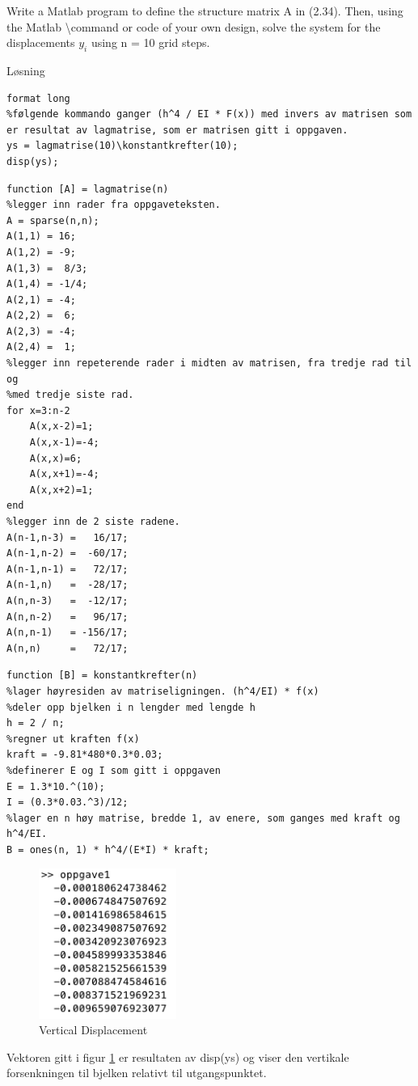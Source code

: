 % 

Write a Matlab program to define the structure matrix A in (2.34). Then, using the Matlab \textbackslash command or code of your own design, solve the system for the displacements $y_i$ using n = 10 grid steps.

\vspace{5mm}
Løsning

\begin{lstlisting}[caption={oppgave1.m}]
format long
%følgende kommando ganger (h^4 / EI * F(x)) med invers av matrisen som er resultat av lagmatrise, som er matrisen gitt i oppgaven.
ys = lagmatrise(10)\konstantkrefter(10);
disp(ys); 
\end{lstlisting}

\begin{lstlisting}[caption={lagmatrise.m}]
function [A] = lagmatrise(n)
%legger inn rader fra oppgaveteksten. 
A = sparse(n,n);
A(1,1) = 16;
A(1,2) = -9;
A(1,3) =  8/3;
A(1,4) = -1/4;
A(2,1) = -4;
A(2,2) =  6;
A(2,3) = -4;
A(2,4) =  1;
%legger inn repeterende rader i midten av matrisen, fra tredje rad til og
%med tredje siste rad. 
for x=3:n-2
    A(x,x-2)=1;
    A(x,x-1)=-4;
    A(x,x)=6;
    A(x,x+1)=-4;
    A(x,x+2)=1;
end
%legger inn de 2 siste radene. 
A(n-1,n-3) =   16/17;
A(n-1,n-2) =  -60/17;
A(n-1,n-1) =   72/17;
A(n-1,n)   =  -28/17;
A(n,n-3)   =  -12/17;
A(n,n-2)   =   96/17;
A(n,n-1)   = -156/17;
A(n,n)     =   72/17;
\end{lstlisting}

\begin{lstlisting}[caption={konstantkrefter.m}]
function [B] = konstantkrefter(n)
%lager høyresiden av matriseligningen. (h^4/EI) * f(x) 
%deler opp bjelken i n lengder med lengde h 
h = 2 / n;        
%regner ut kraften f(x) 
kraft = -9.81*480*0.3*0.03; 
%definerer E og I som gitt i oppgaven
E = 1.3*10.^(10); 
I = (0.3*0.03.^3)/12; 
%lager en n høy matrise, bredde 1, av enere, som ganges med kraft og h^4/EI.
B = ones(n, 1) * h^4/(E*I) * kraft;
\end{lstlisting}

\vspace{3mm}


\begin{figure}[h]
    \centering
    \includegraphics[width=0.4\textwidth]{oppgave1disp}
    \caption{Vertical Displacement}
    \label{fig:errorplot2}
\end{figure}
 
Vektoren gitt i figur \ref{fig:errorplot2} er resultaten av disp(ys) og viser den vertikale forsenkningen til bjelken relativt til utgangspunktet.


% 